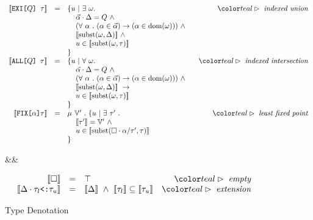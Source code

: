 \documentclass[acmsmall]{acmart}
\theoremstyle{definition}
\begin{document}
\begin{figure*}[h]
\[\begin{array}{rclr}
  \llbracket \code{EXI[$Q$] $\tau$} \rrbracket 
  &=& 
  \begin{array}[t]{@{}l}
  \{ u \ |\ \exists\ \omega . 
  \\
  \I \vec{\alpha} \cdot \Delta = Q\ \land\ 
  \\ 
  \I (\forall\ \alpha\ .\ (\alpha \in \vec{\alpha}) \rightarrow (\alpha \in \text{dom}(\omega)))\ \land\ 
  \\
  \I \llbracket \text{subst}(\omega, \Delta) \rrbracket \ \land\ 
  \\ 
  \I u \in \llbracket \text{subst}(\omega, \tau) \rrbracket
  \\
  \}
  \end{array}
  & 
  \C{indexed union}
  \\
  \llbracket \code{ALL[$Q$] $\tau$} \rrbracket 
  &=& 
  \begin{array}[t]{@{}l}
  \{ u \ |\  \forall\ \omega . 
  \\
  \I \vec{\alpha} \cdot \Delta = Q\ \land\ 
  \\ 
  \I (\forall\ \alpha\ .\ (\alpha \in \vec{\alpha}) \rightarrow (\alpha \in \text{dom}(\omega)))\ \land\ 
  \\
  \I \llbracket \text{subst}(\omega, \Delta) \rrbracket \ \rightarrow  
  \\
  \I u \in \llbracket \text{subst}(\omega, \tau) \rrbracket
  \\
  \}
  \end{array}
  & 
  \C{indexed intersection}
  \\
  \llbracket \code{FIX[$\alpha$]$\tau$} \rrbracket 
  &=& 
  \begin{array}[t]{@{}l}
  \mu\ \mathbb{V}'\ .\ \{ u  \ |\ \exists\ \tau'\ .
  \\
  \I \llbracket \tau' \rrbracket = \mathbb{V'}\ \land\ 
  \\ 
  \I u \in \llbracket \text{subst}(\square \cdot \alpha \slash \tau', \tau) \rrbracket
  \\
  \}
  \end{array}
  & 
  \C{least fixed point}
  \end{array}
  \]
  \begin{flalign*}
    &\boxed{\llbracket \Delta \rrbracket = \phi }&
  \end{flalign*}
  \[
  \begin{array}{rclr}
  \llbracket \square \rrbracket 
  &=& 
  \top
  & \C{empty} 
  \\
  \llbracket \Delta \cdot \code{$\tau_l$<:$\tau_u$} \rrbracket 
  &=& 
  \llbracket \Delta \rrbracket \ \land\ \llbracket \tau_l \rrbracket \subseteq \llbracket \tau_u \rrbracket
  & \C{extension} 
  \end{array}\]
\caption{Type Denotation}
\label{fig:type_denotation}
\end{figure*}
\end{document}
